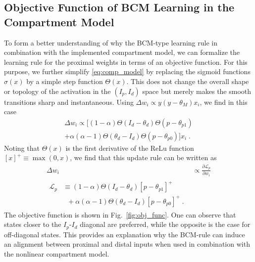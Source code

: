 \documentclass[10pt,a4paper,twocolumn]{article}
\begin{document}
		\subsection{Objective Function of BCM Learning in the Compartment Model}
		\label{sect:Obj_Func}
		
		To form a better understanding of why the BCM-type learning rule
		in combination with the implemented compartment model, we can formalize
		the learning rule for the proximal weights in terms of an objective function.
		For this purpose, we further simplify \eqref{eq:comp_model} by replacing
		the sigmoid functions $\sigma(x)$ by a simple step function $\Theta(x)$. 
		This does not change the overall shape or topology of the activation
		in the $(I_p,I_d)$ space but merely makes the smooth transitions sharp
		and instantaneous. Using $\Delta w_i \propto y\left(y - \theta_M \right) x_i$,
		we find in this case
		\begin{equation}
			\begin{split}
			\Delta w_i \propto [ (1-\alpha) \Theta(I_d - \theta_{d})\Theta(p-\theta_{p1})
			\\ + \alpha (\alpha - 1)\Theta(\theta_{d} - I_d)\Theta(p-\theta_{p0}) ]x_i \; .
			\end{split}
		\end{equation}
		Noting that $\Theta(x)$ is the first derivative of the ReLu function $[x]^+ \equiv \max(0,x)$,
		we find that this update rule can be written as
		\begin{align}
			\Delta w_i &\propto \frac{\partial \mathcal{L}_p}{\partial w_i}\\
			\begin{split}
			\mathcal{L}_p &\equiv (1-\alpha) \Theta(I_d - \theta_{d})[p-\theta_{p1}]^+\\
			&\;\; + \alpha (\alpha - 1)\Theta(\theta_{d} - I_d)[p-\theta_{p0}]^+ \; .
			\end{split}\label{eq:obj_func}
		\end{align} 
		The objective function is shown in Fig.~\ref{fig:obj_func}. One can observe
		that states closer to the $I_p$-$I_d$ diagonal are preferred, while the opposite is the 
		case for off-diagonal states. This provides an explanation why the BCM-rule can induce 
		an alignment between proximal and distal inputs when used in combination with the nonlinear 
		compartment model. 
\end{document}
